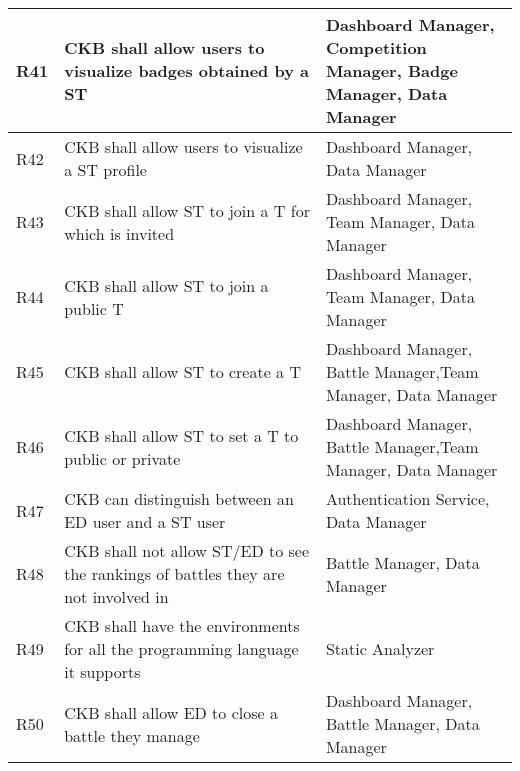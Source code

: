 \begin{center}
\begin{longtable}{|p{0.05\linewidth}|p{0.55\linewidth}|p{0.4\linewidth}|}
        \hline
        R41 & CKB shall allow users to visualize badges obtained by a ST & Dashboard Manager, Competition Manager, Badge Manager, Data Manager \\
        \hline
        R42 & CKB shall allow users to visualize a ST profile & Dashboard Manager,  Data Manager\\
        \hline
        R43 & CKB shall allow ST to join a T for which is invited & Dashboard Manager, Team Manager, Data Manager \\
        \hline
        R44 & CKB shall allow ST to join a public T & Dashboard Manager, Team Manager, Data Manager \\
        \hline
        R45 & CKB shall allow ST to create a T & Dashboard Manager, Battle Manager,Team Manager, Data Manager \\
        \hline
        R46 & CKB shall allow ST to set a T to public or private & Dashboard Manager, Battle Manager,Team Manager, Data Manager  \\
        \hline
        R47 & CKB can distinguish between an ED user and a ST user & Authentication Service, Data Manager \\
        \hline
        R48 & CKB shall not allow ST/ED to see the rankings of battles they are not involved in & Battle Manager, Data Manager\\
        \hline
        R49 & CKB shall have the environments for all the programming language it supports & Static Analyzer\\
        \hline
        R50 & CKB shall allow ED to close a battle they manage & Dashboard Manager, Battle Manager, Data Manager \\
        \hline

  \end{longtable}
\end{center}
